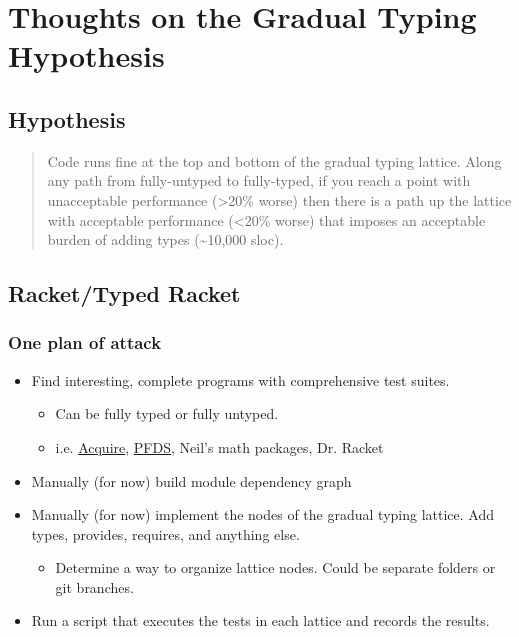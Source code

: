 \documentclass[11pt]{article}
\begin{document}

\section{Thoughts on the Gradual Typing Hypothesis}
\label{sec-1}
\subsection{Hypothesis}
\label{sec-1-1}

  \begin{quote}
    Code runs fine at the top and bottom of the gradual typing lattice.
    Along any path from fully-untyped to fully-typed, if you reach a point with unacceptable performance (>20\% worse) then there is a path up the lattice with acceptable performance (<20\% worse) that imposes an acceptable burden of adding types (\~{}10,000 sloc).
  \end{quote}

\subsection{Racket/Typed Racket}
\label{sec-1-2}
\subsubsection{One plan of attack}
\label{sec-1-2-1}

\begin{itemize}
\item Find interesting, complete programs with comprehensive test suites.
\begin{itemize}
\item Can be fully typed or fully untyped.
\item i.e. \href{https://github.com/mfelleisen/Acquire}{Acquire}, \href{https://github.com/takikawa/tr-pfds}{PFDS}, Neil's math packages, Dr. Racket
\end{itemize}
\item Manually (for now) build module dependency graph
\item Manually (for now) implement the nodes of the gradual typing lattice.
    Add types, provides, requires, and anything else.
\begin{itemize}
\item Determine a way to organize lattice nodes. Could be separate folders or git branches.
\end{itemize}
\item Run a script that executes the tests in each lattice and records the results.
\end{itemize}
\end{document}
